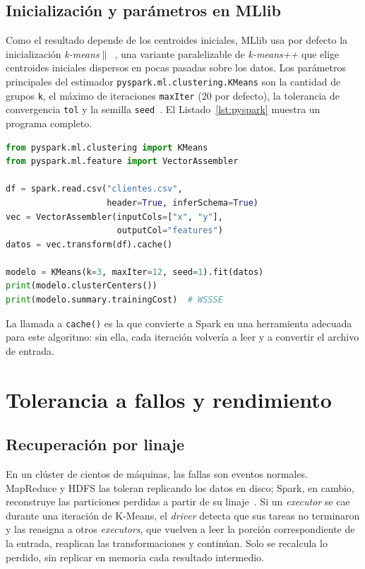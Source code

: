 \documentclass[conference,a4paper]{IEEEtran}
\begin{document}
\subsection{Inicialización y parámetros en MLlib}

Como el resultado depende de los centroides iniciales, MLlib usa por defecto la inicialización \textit{k-means$\|$}~\cite{bahmani2012scalable}, una variante paralelizable de \textit{k-means++} que elige centroides iniciales dispersos en pocas pasadas sobre los datos. Los parámetros principales del estimador \texttt{pyspark.ml.clustering.KMeans} son la cantidad de grupos \texttt{k}, el máximo de iteraciones \texttt{maxIter} (20 por defecto), la tolerancia de convergencia \texttt{tol} y la semilla \texttt{seed}~\cite{spark-mllib}. El Listado~\ref{lst:pyspark} muestra un programa completo.

\begin{lstlisting}[language=Python, caption={K-Means con PySpark y MLlib}, label={lst:pyspark}]
from pyspark.ml.clustering import KMeans
from pyspark.ml.feature import VectorAssembler

df = spark.read.csv("clientes.csv",
                    header=True, inferSchema=True)
vec = VectorAssembler(inputCols=["x", "y"],
                      outputCol="features")
datos = vec.transform(df).cache()

modelo = KMeans(k=3, maxIter=12, seed=1).fit(datos)
print(modelo.clusterCenters())
print(modelo.summary.trainingCost)  # WSSSE
\end{lstlisting}

La llamada a \texttt{cache()} es la que convierte a Spark en una herramienta adecuada para este algoritmo: sin ella, cada iteración volvería a leer y a convertir el archivo de entrada.

\section{Tolerancia a fallos y rendimiento}
\label{sec:fallos}

\subsection{Recuperación por linaje}

En un clúster de cientos de máquinas, las fallas son eventos normales. MapReduce y HDFS las toleran replicando los datos en disco; Spark, en cambio, reconstruye las particiones perdidas a partir de su linaje~\cite{zaharia2012rdd}. Si un \textit{executor} se cae durante una iteración de K-Means, el \textit{driver} detecta que sus tareas no terminaron y las reasigna a otros \textit{executors}, que vuelven a leer la porción correspondiente de la entrada, reaplican las transformaciones y continúan. Solo se recalcula lo perdido, sin replicar en memoria cada resultado intermedio.
\end{document}
